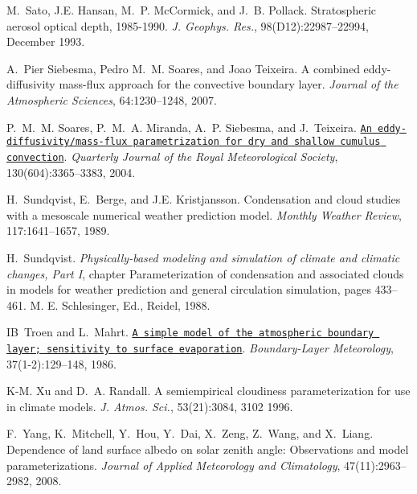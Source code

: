 \begin{DoxyDescription}
\item[\label{_CITEREF_sato_et_al_1993}%
\mbox{[}56\mbox{]}]M.~Sato, J.\+E. Hansan, M.~P. Mc\+Cormick, and J.~B. Pollack. Stratospheric aerosol optical depth, 1985-\/1990. {\itshape J. Geophys. Res.}, 98(D12)\+:22987--22994, December 1993.


\item[\label{_CITEREF_siebesma_et_al_2007}%
\mbox{[}57\mbox{]}]A.~Pier Siebesma, Pedro M.~M. Soares, and Joao Teixeira. A combined eddy-\/diffusivity mass-\/flux approach for the convective boundary layer. {\itshape Journal of the Atmospheric Sciences}, 64\+:1230--1248, 2007. 


\item[\label{_CITEREF_soares_et_al_2004}%
\mbox{[}58\mbox{]}]P.~M.~M. Soares, P.~M.~A. Miranda, A.~P. Siebesma, and J.~Teixeira. \href{http://dx.doi.org/10.1256/qj.03.223}{\tt An eddy-\/diffusivity/mass-\/flux parametrization for dry and shallow cumulus convection}. {\itshape Quarterly Journal of the Royal Meteorological Society}, 130(604)\+:3365--3383, 2004. 


\item[\label{_CITEREF_sundqvist_et_al_1989}%
\mbox{[}59\mbox{]}]H.~Sundqvist, E.~Berge, and J.\+E. Kristjansson. Condensation and cloud studies with a mesoscale numerical weather prediction model. {\itshape Monthly Weather Review}, 117\+:1641--1657, 1989.


\item[\label{_CITEREF_sundqvist_1988}%
\mbox{[}60\mbox{]}]H.~Sundqvist. {\itshape Physically-\/based modeling and simulation of climate and climatic changes, Part I}, chapter Parameterization of condensation and associated clouds in models for weather prediction and general circulation simulation, pages 433--461. M. E. Schlesinger, Ed., Reidel, 1988.


\item[\label{_CITEREF_troen_and_mahrt_1986}%
\mbox{[}61\mbox{]}]IB~Troen and L.~Mahrt. \href{http://dx.doi.org/10.1007/BF00122760}{\tt A simple model of the atmospheric boundary layer; sensitivity to surface evaporation}. {\itshape Boundary-\/\+Layer Meteorology}, 37(1-\/2)\+:129--148, 1986. 


\item[\label{_CITEREF_xu_and_randall_1996}%
\mbox{[}62\mbox{]}]K-\/M. Xu and D.~A. Randall. A semiempirical cloudiness parameterization for use in climate models. {\itshape J. Atmos. Sci.}, 53(21)\+:3084, 3102 1996.


\item[\label{_CITEREF_yang_et_al_2008}%
\mbox{[}63\mbox{]}]F.~Yang, K.~Mitchell, Y.~Hou, Y.~Dai, X.~Zeng, Z.~Wang, and X.~Liang. Dependence of land surface albedo on solar zenith angle\+: Observations and model parameterizations. {\itshape Journal of Applied Meteorology and Climatology}, 47(11)\+:2963--2982, 2008.



\end{DoxyDescription}
